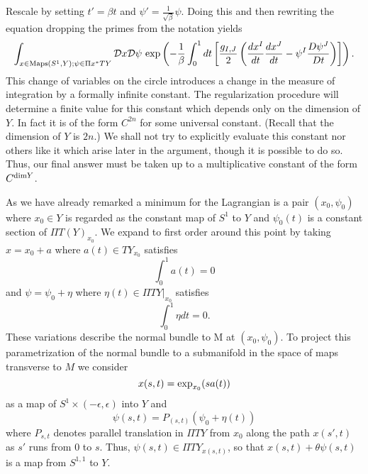 Rescale by setting $t'=\beta t$ and
$\psi'=\frac{1}{\sqrt{\beta}}\psi$.
Doing this and then rewriting the equation dropping the primes from
the notation yields
\begin{equation}\label{eqno}
\int_{x\in{\rm Maps}(S^1,Y);\psi\in \Pi x^*TY}{\cal D}x{\cal
D}\psi\ {\rm exp}\left(-\frac{1}{\beta}\int_0^1 
dt\left[\frac{g_{I,J}}{2}\left(\frac{dx^I}{dt}\frac{dx^J}{dt}
-\psi^I\frac{D\psi^J}{Dt}\right)\right]\right).
\end{equation}
This change of variables on the circle introduces a change in the
measure of integration by a formally infinite constant. The
regularization procedure will determine a finite value for this
constant which depends only on the dimension of $Y$.  In fact it is of
the form $C^{2n}$ for some universal constant. (Recall that the
dimension of $Y$ is $2n$.) We shall not try to
explicitly evaluate this constant  
nor others like it which arise later in the argument, though it is
possible to do so.  Thus, our final answer must be taken up to a
multiplicative constant of the form $C^{{\rm dim} Y}$.


As we have already remarked a minimum for the Lagrangian is a pair
$(x_0,\psi_0)$  where $x_0\in Y$ is regarded as the constant map of
$S^1$ to $Y$ and 
$\psi_0(t)$ is a constant section of $\Pi T(Y)_{x_0}$.
We expand to first order around this point by taking $x=x_0+a$
where $a(t)\in TY_{x_0}$ satisfies
\begin{equation}\label{ave1}
\int_0^1a(t)=0
\end{equation}
 and
$\psi=\psi_0+\eta$ where $\eta(t)\in \Pi TY|_{x_0}$ satisfies
\begin{equation}\label{ave2}
\int_0^1\eta dt=0.
\end{equation}
 These variations describe the normal bundle to
M at $(x_0,\psi_0)$.
To project this parametrization of the normal bundle  to a submanifold
in the space of maps transverse to $M$ we consider
$$x(s,t)={\rm exp}_{x_0}(s a(t))$$
as a map of $S^1\times (-\epsilon,\epsilon)$ into $Y$ and 
$$\psi(s,t)=P_{(s,t)}\left(\psi_0+\eta(t)\right)$$
where $P_{s,t}$ denotes parallel translation in $\Pi TY$ from $x_0$
along the path $x(s',t)$ as $s'$ runs from $0$ to $s$.
Thus, $\psi(s,t)\in \Pi TY_{x(s,t)}$, so that
$x(s,t)+\theta\psi(s,t)$ is a map from $S^{1,1}$ to $Y$. 

